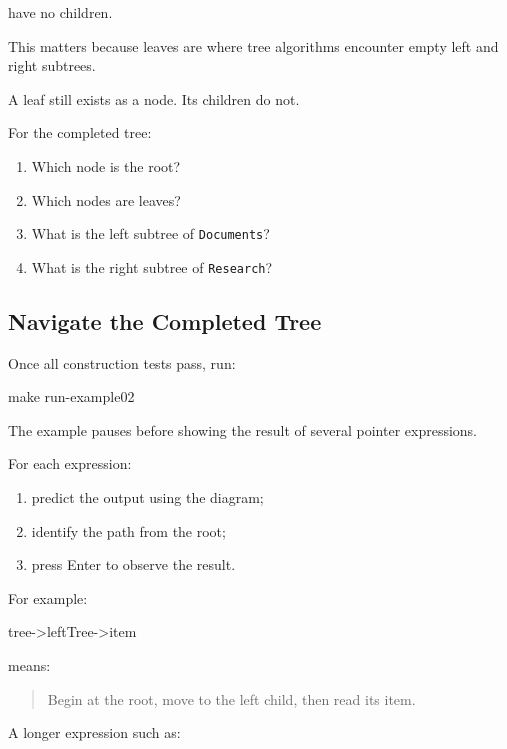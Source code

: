 \documentclass{csc2059practical}
\begin{document}
have no children.

This matters because leaves are where tree algorithms encounter empty left and
right subtrees.

A leaf still exists as a node. Its children do not.

\begin{reflectionbox}
For the completed tree:

\begin{enumerate}
    \item Which node is the root?
    \item Which nodes are leaves?
    \item What is the left subtree of \texttt{Documents}?
    \item What is the right subtree of \texttt{Research}?
\end{enumerate}
\end{reflectionbox}

\subsection{Navigate the Completed Tree}

Once all construction tests pass, run:

\begin{terminal}
make run-example02
\end{terminal}

The example pauses before showing the result of several pointer expressions.

For each expression:

\begin{enumerate}
    \item predict the output using the diagram;
    \item identify the path from the root;
    \item press Enter to observe the result.
\end{enumerate}

For example:

\begin{cppcode}
tree->leftTree->item
\end{cppcode}

means:

\begin{quote}
Begin at the root, move to the left child, then read its item.
\end{quote}

A longer expression such as:
\end{document}

